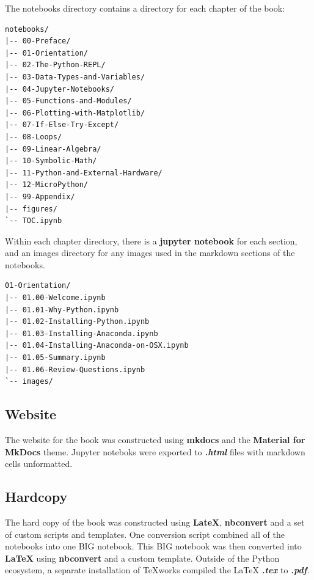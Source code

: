 \documentclass{book}
\begin{document}
    
        The notebooks directory contains a directory for each chapter of the
book:
    




    
        \begin{lstlisting}
notebooks/
|-- 00-Preface/
|-- 01-Orientation/
|-- 02-The-Python-REPL/
|-- 03-Data-Types-and-Variables/
|-- 04-Jupyter-Notebooks/
|-- 05-Functions-and-Modules/
|-- 06-Plotting-with-Matplotlib/
|-- 07-If-Else-Try-Except/
|-- 08-Loops/
|-- 09-Linear-Algebra/
|-- 10-Symbolic-Math/
|-- 11-Python-and-External-Hardware/
|-- 12-MicroPython/
|-- 99-Appendix/
|-- figures/
`-- TOC.ipynb
\end{lstlisting}
    




    
        Within each chapter directory, there is a \textbf{jupyter notebook} for
each section, and an images directory for any images used in the
markdown sections of the notebooks.

\begin{lstlisting}
01-Orientation/
|-- 01.00-Welcome.ipynb
|-- 01.01-Why-Python.ipynb
|-- 01.02-Installing-Python.ipynb
|-- 01.03-Installing-Anaconda.ipynb
|-- 01.04-Installing-Anaconda-on-OSX.ipynb
|-- 01.05-Summary.ipynb
|-- 01.06-Review-Questions.ipynb
`-- images/
\end{lstlisting}
    




    
        \subsection{Website}\label{website}
    




    
        The website for the book was constructed using \textbf{mkdocs} and the
\textbf{Material for MkDocs} theme. Jupyter noteboks were exported to
\textbf{\emph{.html}} files with markdown cells unformatted.
    




    
        \subsection{Hardcopy}\label{hardcopy}
    




    
        The hard copy of the book was constructed using \textbf{LateX},
\textbf{nbconvert} and a set of custom scripts and templates. One
conversion script combined all of the notebooks into one BIG notebook.
This BIG notebook was then converted into \textbf{LaTeX} using
\textbf{nbconvert} and a custom template. Outside of the Python
ecosystem, a separate installation of TeXworks compiled the LaTeX
\textbf{\emph{.tex}} to \textbf{\emph{.pdf}}.
    
\end{document}
